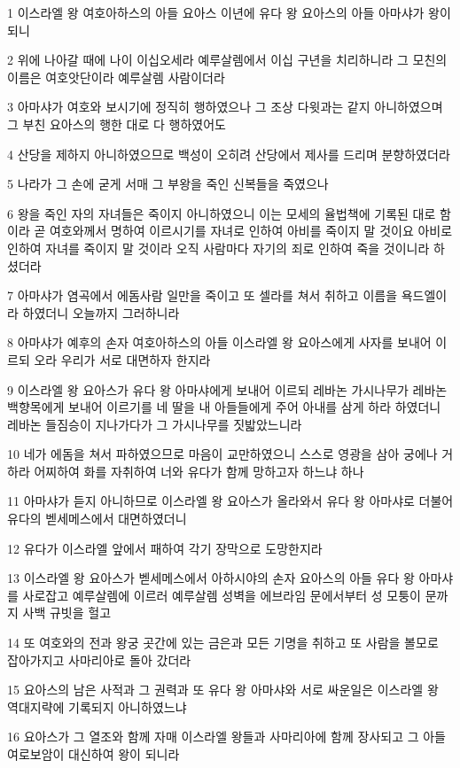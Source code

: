 \par 1 이스라엘 왕 여호아하스의 아들 요아스 이년에 유다 왕 요아스의 아들 아마샤가 왕이 되니
\par 2 위에 나아갈 때에 나이 이십오세라 예루살렘에서 이십 구년을 치리하니라 그 모친의 이름은 여호앗단이라 예루살렘 사람이더라
\par 3 아마샤가 여호와 보시기에 정직히 행하였으나 그 조상 다윗과는 같지 아니하였으며 그 부친 요아스의 행한 대로 다 행하였어도
\par 4 산당을 제하지 아니하였으므로 백성이 오히려 산당에서 제사를 드리며 분향하였더라
\par 5 나라가 그 손에 굳게 서매 그 부왕을 죽인 신복들을 죽였으나
\par 6 왕을 죽인 자의 자녀들은 죽이지 아니하였으니 이는 모세의 율법책에 기록된 대로 함이라 곧 여호와께서 명하여 이르시기를 자녀로 인하여 아비를 죽이지 말 것이요 아비로 인하여 자녀를 죽이지 말 것이라 오직 사람마다 자기의 죄로 인하여 죽을 것이니라 하셨더라
\par 7 아마샤가 염곡에서 에돔사람 일만을 죽이고 또 셀라를 쳐서 취하고 이름을 욕드엘이라 하였더니 오늘까지 그러하니라
\par 8 아마샤가 예후의 손자 여호아하스의 아들 이스라엘 왕 요아스에게 사자를 보내어 이르되 오라 우리가 서로 대면하자 한지라
\par 9 이스라엘 왕 요아스가 유다 왕 아마샤에게 보내어 이르되 레바논 가시나무가 레바논 백향목에게 보내어 이르기를 네 딸을 내 아들들에게 주어 아내를 삼게 하라 하였더니 레바논 들짐승이 지나가다가 그 가시나무를 짓밟았느니라
\par 10 네가 에돔을 쳐서 파하였으므로 마음이 교만하였으니 스스로 영광을 삼아 궁에나 거하라 어찌하여 화를 자취하여 너와 유다가 함께 망하고자 하느냐 하나
\par 11 아마샤가 듣지 아니하므로 이스라엘 왕 요아스가 올라와서 유다 왕 아마샤로 더불어 유다의 벧세메스에서 대면하였더니
\par 12 유다가 이스라엘 앞에서 패하여 각기 장막으로 도망한지라
\par 13 이스라엘 왕 요아스가 벧세메스에서 아하시야의 손자 요아스의 아들 유다 왕 아마샤를 사로잡고 예루살렘에 이르러 예루살렘 성벽을 에브라임 문에서부터 성 모퉁이 문까지 사백 규빗을 헐고
\par 14 또 여호와의 전과 왕궁 곳간에 있는 금은과 모든 기명을 취하고 또 사람을 볼모로 잡아가지고 사마리아로 돌아 갔더라
\par 15 요아스의 남은 사적과 그 권력과 또 유다 왕 아마샤와 서로 싸운일은 이스라엘 왕 역대지략에 기록되지 아니하였느냐
\par 16 요아스가 그 열조와 함께 자매 이스라엘 왕들과 사마리아에 함께 장사되고 그 아들 여로보암이 대신하여 왕이 되니라
